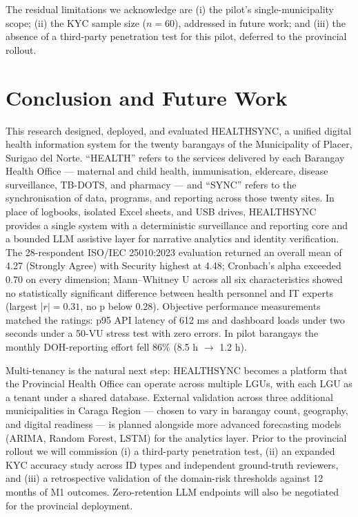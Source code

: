 \documentclass[conference]{IEEEtran}
\begin{document}
The residual limitations we acknowledge are (i) the pilot's single-municipality scope; (ii) the KYC sample size ($n = 60$), addressed in future work; and (iii) the absence of a third-party penetration test for this pilot, deferred to the provincial rollout.

\section{Conclusion and Future Work}
\label{sec:conclusion}
This research designed, deployed, and evaluated HEALTHSYNC, a unified digital health information system for the twenty barangays of the Municipality of Placer, Surigao del Norte. ``HEALTH'' refers to the services delivered by each Barangay Health Office --- maternal and child health, immunisation, eldercare, disease surveillance, TB-DOTS, and pharmacy --- and ``SYNC'' refers to the synchronisation of data, programs, and reporting across those twenty sites. In place of logbooks, isolated Excel sheets, and USB drives, HEALTHSYNC provides a single system with a deterministic surveillance and reporting core and a bounded LLM assistive layer for narrative analytics and identity verification. The 28-respondent ISO/IEC 25010:2023 evaluation returned an overall mean of 4.27 (Strongly Agree) with Security highest at 4.48; Cronbach's alpha exceeded 0.70 on every dimension; Mann--Whitney U across all six characteristics showed no statistically significant difference between health personnel and IT experts (largest $|r| = 0.31$, no p below 0.28). Objective performance measurements matched the ratings: p95 API latency of 612 ms and dashboard loads under two seconds under a 50-VU stress test with zero errors. In pilot barangays the monthly DOH-reporting effort fell 86\% (8.5 h $\rightarrow$ 1.2 h).

Multi-tenancy is the natural next step: HEALTHSYNC becomes a platform that the Provincial Health Office can operate across multiple LGUs, with each LGU as a tenant under a shared database. External validation across three additional municipalities in Caraga Region --- chosen to vary in barangay count, geography, and digital readiness --- is planned alongside more advanced forecasting models (ARIMA, Random Forest, LSTM) for the analytics layer. Prior to the provincial rollout we will commission (i) a third-party penetration test, (ii) an expanded KYC accuracy study across ID types and independent ground-truth reviewers, and (iii) a retrospective validation of the domain-risk thresholds against 12 months of M1 outcomes. Zero-retention LLM endpoints will also be negotiated for the provincial deployment.
\end{document}
